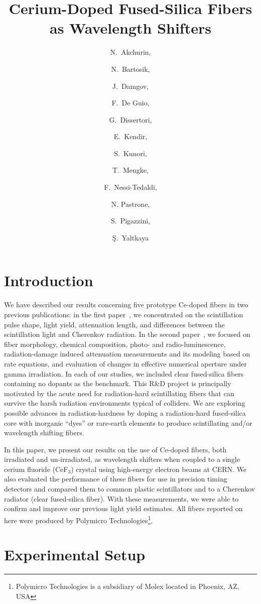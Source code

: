 \documentclass[a4paper,11pt]{article}
\title{\boldmath  Cerium-Doped Fused-Silica Fibers
as Wavelength Shifters}
\author[a,1]{N.~Akchurin,\note{Corresponding author.}}
\author[d]{N.~Bartosik,}
\author[a]{J.~Damgov,}
\author[a]{F.~De Guio,}
\author[c]{G.~Dissertori,}
\author[b]{E.~Kendir,}
\author[a]{S.~Kunori,}
\author[a]{T.~Mengke,}
\author[c]{F.~Nessi-Tedaldi,}
\author[d]{N. Pastrone,}
\author[c]{S.~Pigazzini,}
\author[b]{\c{S}.~Yaltkaya}
\affiliation[a]{Texas Tech University, Department of Physics and Astronomy,  Lubbock, TX, 79409, USA}
\affiliation[b]{Akdeniz University, Department of Physics, Antalya, 07070, Turkey}
\affiliation[c]{ETH, Z\"urich, Switzerland}
\affiliation[d]{INFN-Torino, Italy}
\begin{document}
\maketitle
\flushbottom

\section{Introduction}
\label{sec:intro}
We have described our results concerning five prototype Ce-doped fibers in two previous publications:  in the first paper~\cite{JINSTPaper}, we concentrated on the scintillation pulse shape, light yield, attenuation length, and differences between the scintillation light and Cherenkov radiation.  In the second paper~\cite{JINSTPaper2}, we focused on fiber morphology, chemical composition, photo- and radio-luminescence, radiation-damage induced attenuation measurements and its modeling based on rate equations, and evaluation of changes in effective numerical aperture under gamma irradiation.   In each of our studies, we included clear fused-silica fibers containing no dopants  as the benchmark. This R\&D project is principally motivated by the acute need for radiation-hard scintillating fibers that can survive the harsh radiation environments typical of colliders.  We are exploring possible advances in radiation-hardness by doping a radiation-hard fused-silica core with inorganic ``dyes'' or rare-earth elements to produce scintillating and/or wavelength shifting fibers.

In this paper, we present our results on the use of Ce-doped fibers, both irradiated and un-irradiated, as wavelength shifters when coupled to a single cerium fluoride (CeF$_3$) crystal using high-energy electron beams at CERN.  We also evaluated the performance of these fibers for use in precision timing detectors and compared them to common plastic scintillators and to a Cherenkov radiator (clear fused-silica fiber).  With these measurements, we were able to confirm and improve our previous light yield estimates.  All fibers reported on here were produced by Polymicro Technologies\footnote{Polymicro Technologies is a subsidiary of Molex located in Phoenix, AZ, USA}.

\section{Experimental Setup}
\label{sec:experimentalsetup}

\end{document}
